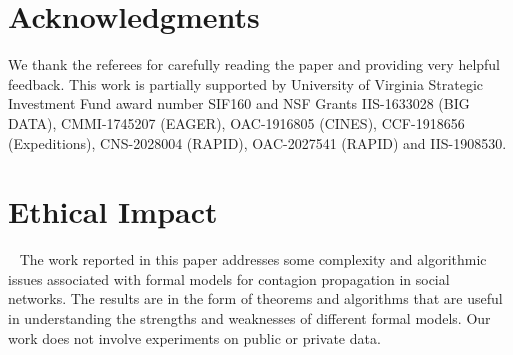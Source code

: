 \documentclass[letterpaper]{article} %
\begin{document}








%



%



% 

%



\clearpage


%

\section{Acknowledgments}
We thank the referees for carefully reading
the paper and providing very helpful feedback.
This work is partially supported by 
University of Virginia Strategic Investment Fund 
award number SIF160 and NSF Grants  
IIS-1633028 (BIG DATA),
CMMI-1745207 (EAGER),
OAC-1916805 (CINES),
CCF-1918656 (Expeditions),
CNS-2028004 (RAPID),
OAC-2027541 (RAPID) and
IIS-1908530.

\bigskip

\section{Ethical Impact}~ 
The work reported in this paper addresses some complexity and algorithmic
issues associated with formal models for contagion
propagation in social networks.
The results are in the form of theorems and algorithms
that are useful in understanding the strengths and
weaknesses of different formal models.
Our work does not involve experiments on public or private data.

\bigskip


\end{document}
